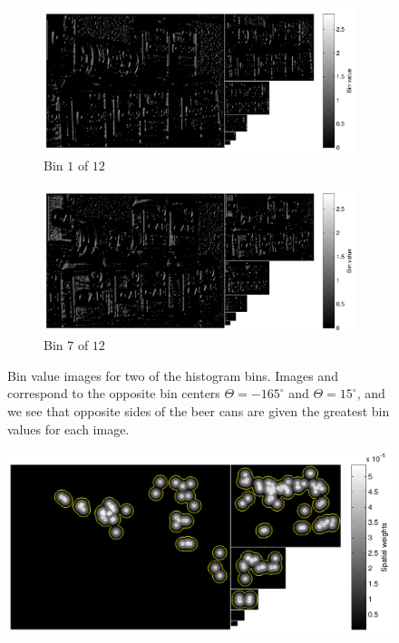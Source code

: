 \documentclass[thesis.tex]{subfiles}
\begin{document}
\begin{figure}[p]
	\centering
	\begin{subfigure}[t]{\textwidth}
		\includegraphics[width=\textwidth]{img/cellHistScaleSpacesBin01.pdf}
    	\caption{Bin $1$ of $12$}
    	\label{fig:cellHistScaleSpacesBin01}
	\end{subfigure}
	\begin{subfigure}[t]{\textwidth}
		\includegraphics[width=\textwidth]{img/cellHistScaleSpacesBin07.pdf}
    	\caption{Bin $7$ of $12$}
    	\label{fig:cellHistScaleSpacesBin07}
	\end{subfigure}
	\caption{Bin value images for two of the histogram bins. Images  and  correspond to the opposite bin centers $\Theta = -165^\circ$ and $\Theta = 15^\circ$, and we see that opposite sides of the beer cans are given the greatest bin values for each image.}
	\label{fig:cellHistScaleSpacesBins}
\end{figure}

\begin{figure}[tb]
    \centering
    \includegraphics[width=\textwidth]{img/cellHistScaleSpacesSpatialWeights.pdf}
    \caption{}
    \label{fig:cellHistScaleSpacesSpatialWeights}
\end{figure}
%
\end{document}
